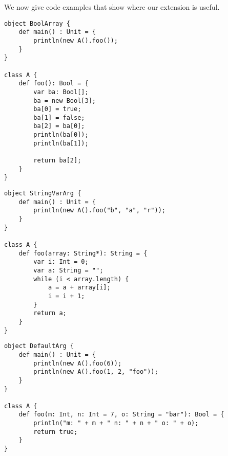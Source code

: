 %
%
%

We now give code examples that show where our extension is useful.\\

\begin{lstlisting}[caption={This program prints true, false, true}]
object BoolArray {
    def main() : Unit = {
        println(new A().foo());
    }
}

class A {
    def foo(): Bool = {
        var ba: Bool[];
        ba = new Bool[3];
        ba[0] = true;
        ba[1] = false;
        ba[2] = ba[0];
        println(ba[0]);
        println(ba[1]);
        
        return ba[2];
    }
}
\end{lstlisting}

\begin{lstlisting}[caption={VarArgs: this program prints "bar"}]
object StringVarArg {
    def main() : Unit = {
        println(new A().foo("b", "a", "r"));
    }
}

class A {
    def foo(array: String*): String = {
		var i: Int = 0;
        var a: String = "";
        while (i < array.length) {
            a = a + array[i];
            i = i + 1;
        }
		return a;
    }
}
\end{lstlisting}

\begin{lstlisting}[caption={Default arguments: this program prints "m: 6 n: 7 o: bar, m: 1 n: 2 o: foo"}]
object DefaultArg {
    def main() : Unit = {
        println(new A().foo(6));
        println(new A().foo(1, 2, "foo"));
    }
}

class A {
    def foo(m: Int, n: Int = 7, o: String = "bar"): Bool = {
        println("m: " + m + " n: " + n + " o: " + o);
        return true;
    }
}
\end{lstlisting}


